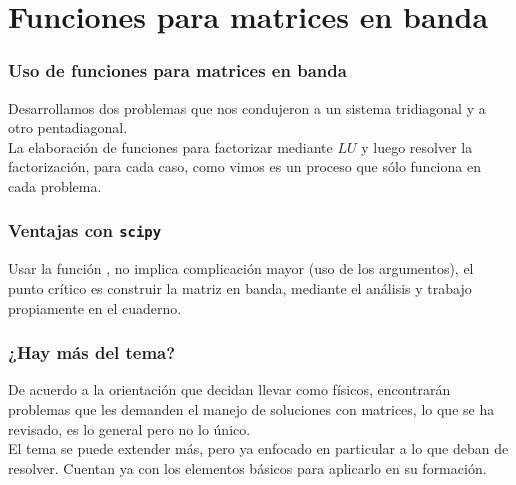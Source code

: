 \section{Funciones para matrices en banda}
\begin{frame}
\frametitle{Uso de funciones para matrices en banda}
 Desarrollamos dos problemas que nos condujeron a un sistema tridiagonal y a otro pentadiagonal.
 \\
 \bigskip
 La elaboración de funciones para factorizar mediante $LU$ y luego resolver la factorización, para cada caso, como vimos es un proceso que sólo funciona en cada problema.
\end{frame}
\begin{frame}
\frametitle{Ventajas con \texttt{scipy}}
Usar la función , no implica complicación mayor (uso de los argumentos), el punto crítico es construir la matriz en banda, mediante el análisis y trabajo propiamente en el cuaderno.
\end{frame}
\begin{frame}
\frametitle{¿Hay más del tema?}
De acuerdo a la orientación que decidan llevar como físicos, encontrarán problemas que les demanden el manejo de soluciones con matrices, lo que se ha revisado, es lo general pero no lo único.
\\
\bigskip
El tema se puede extender más, pero ya enfocado en particular a lo que deban de resolver. Cuentan ya con los elementos básicos para aplicarlo en su formación.
\end{frame}
